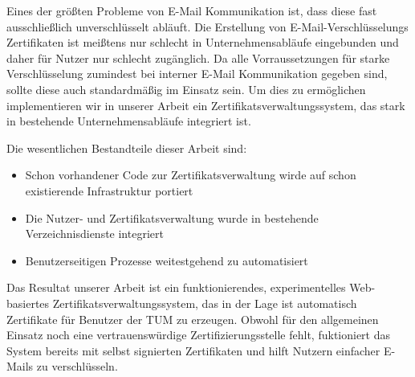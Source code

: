 \small

Eines der größten Probleme von E-Mail Kommunikation ist, dass diese fast ausschließlich unverschlüsselt abläuft.
Die Erstellung von E-Mail-Verschlüsselungs Zertifikaten ist meißtens nur schlecht in Unternehmensabläufe eingebunden und
daher für Nutzer nur schlecht zugänglich.
Da alle Vorraussetzungen für starke Verschlüsselung zumindest bei interner E-Mail Kommunikation gegeben sind, sollte
diese auch standardmäßig im Einsatz sein.
Um dies zu ermöglichen implementieren wir in unserer Arbeit ein Zertifikatsverwaltungssystem, das stark in bestehende
Unternehmensabläufe integriert ist.

Die wesentlichen Bestandteile dieser Arbeit sind:
\begin{itemize}
    \item Schon vorhandener Code zur Zertifikatsverwaltung wirde auf schon existierende Infrastruktur portiert
    \item Die Nutzer- und Zertifikatsverwaltung wurde in bestehende Verzeichnisdienste integriert
    \item Benutzerseitigen Prozesse weitestgehend zu automatisiert
\end{itemize}

Das Resultat unserer Arbeit ist ein funktionierendes, experimentelles Web-basiertes Zertifikatsverwaltungssystem, das in
der Lage ist automatisch Zertifikate für Benutzer der TUM zu erzeugen.
Obwohl für den allgemeinen Einsatz noch eine vertrauenswürdige Zertifizierungsstelle fehlt, fuktioniert das System
bereits mit selbst signierten Zertifikaten und hilft Nutzern einfacher E-Mails zu verschlüsseln.

